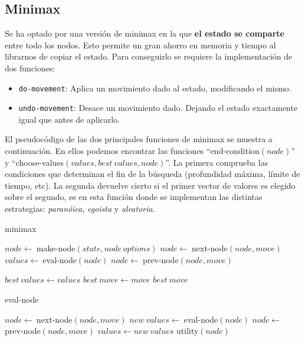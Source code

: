 \subsection{Minimax}

Se ha optado por una versión de minimax en la que \textbf{el estado se comparte}
entre todo los nodos. Esto permite un gran ahorro en memoria y tiempo al
librarnos de copiar el estado. Para conseguirlo se requiere la implementación de
dos funciones:

\begin{itemize}
	\item \texttt{do-movement}: Aplica un movimiento dado al estado,
		modificando el mismo.
	\item \texttt{undo-movement}: Desace un movimiento dado. Dejando el
		estado exactamente igual que antes de aplicarlo.
\end{itemize}

El pseudocódigo de las dos principales funciones de minimax se muestra a
continuación. En ellos podemos encontrar las funciones ``end-condition$(node)$''
y ``choose-values$(values, best\ values, node)$''. La primera comprueba las
condiciones que determinan el fin de la búsqueda (profundidad máxima, límite de
tiempo, etc). La segunda devuelve cierto si el primer vector de valores es
elegido sobre el segundo, es en esta función donde se implementan las distintas
estrategias: \textsl{paranóica}, \textsl{egoista} y \textsl{aleatoria}.

\clearpage
\begin{algorithm}
\caption{minimax}\label{minimax}
\begin{algorithmic}
	 
	\State $node \gets\ $make-node$(state, node\ options)$
		\State $node \gets\ $next-node$(node, move)$ 
		\State $values \gets\ $eval-node$(node)$
		\State $node \gets\ $prev-node$(node, move)$ 
	\EndFor

		\State $best\ values \gets values$
		\State $best\ move \gets move$
	\EndIf
	\State \Return $best\ move$
	\EndFunction
\end{algorithmic}
\end{algorithm}

\begin{algorithm}
\caption{eval-node}\label{eval-node}
\begin{algorithmic}
		\State $node \gets\ $next-node$(node, move)$  
		\State $new\ values \gets\ $eval-node$(node)$
		\State $node \gets\ $prev-node$(node, move)$  
	\EndFor
		\State $values \gets new\ values$
	\EndIf
	\State \Return utility$(node)$
	\EndFunction
\end{algorithmic}
\end{algorithm}
